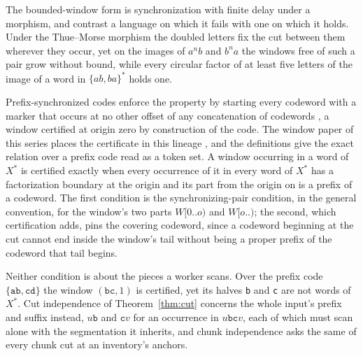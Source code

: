 \documentclass[11pt,a4paper]{article}
\theoremstyle{definition}
\theoremstyle{plain}
\newcommand{\code}[1]{\texttt{#1}}
\begin{document}
The bounded-window form is synchronization with finite delay under a morphism, and \citet[Example~21]{fici2025morphisms}
contrast a language on which it fails with one on which it holds. Under the Thue--Morse morphism the doubled letters fix
the cut between them wherever they occur, yet on the images of $a^{n}b$ and $b^{n}a$ the windows free of such a pair
grow without bound, while every circular factor of at least five letters of the image of a word in $\{ab, ba\}^{*}$
holds one.

Prefix-synchronized codes enforce the property by starting every codeword with a marker that occurs at no other offset
of any concatenation of codewords \citep{morita1996prefix}, a window certified at origin zero by construction of the
code. The window paper of this series places the certificate in this lineage \citep{nidhogg2026splitwindows}, and the
definitions give the exact relation over a prefix code read as a token set. A window occurring in a word of $X^{*}$ is
certified exactly when every occurrence of it in every word of $X^{*}$ has a factorization boundary at the origin and
its part from the origin on is a prefix of a codeword. The first condition is the synchronizing-pair condition, in the
general convention, for the window's two parts $W[0..o)$ and $W[o..)$; the second, which certification adds, pins the
covering codeword, since a codeword beginning at the cut cannot end inside the window's tail without being a proper
prefix of the codeword that tail begins.

Neither condition is about the pieces a worker scans. Over the prefix code $\{\code{ab}, \code{cd}\}$ the window
$(\code{bc}, 1)$ is certified, yet its halves \code{b} and \code{c} are not words of $X^{*}$. Cut independence of
Theorem~\ref{thm:cut} concerns the whole input's prefix and suffix instead, $u\code{b}$ and $\code{c}v$ for an
occurrence in $u\code{bc}v$, each of which must scan alone with the segmentation it inherits, and chunk independence
asks the same of every chunk cut at an inventory's anchors.
\end{document}

